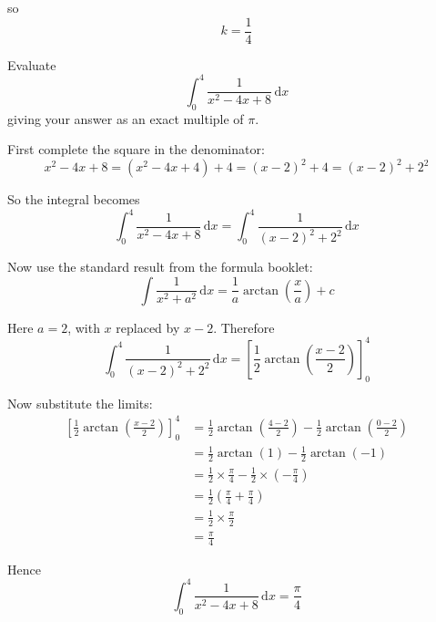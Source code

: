 \documentclass[leqno]{article}
\begin{document}
\begin{enumerate}[
  label=\textbf{\arabic*.},
  leftmargin=*,
  topsep=0pt,
  partopsep=0pt,
  parsep=0pt
]
\begin{djsSolution}
\begin{enumerate}[label=\textbf{(\alph*)}]
  so
  \[
  k=\frac{1}{4}
  \]
\end{enumerate}
\end{djsSolution}

\newpage
\questionitem

Evaluate
\[
\int_{0}^{4} \frac{1}{x^2-4x+8}\, \mathrm{d}x
\]
giving your answer as an exact multiple of $\pi$. 

\vspace*{10pt}

\begin{djsSolution}
First complete the square in the denominator:
\[
x^2-4x+8=(x^2-4x+4)+4=(x-2)^2+4=(x-2)^2+2^2
\]

So the integral becomes
\[
\int_0^4 \frac{1}{x^2-4x+8}\,\mathrm{d}x
=
\int_0^4 \frac{1}{(x-2)^2+2^2}\,\mathrm{d}x
\]

Now use the standard result from the formula booklet:
\[
\int \frac{1}{x^2+a^2}\,\mathrm{d}x=\frac{1}{a}\arctan\left(\frac{x}{a}\right)+c
\]

Here $a=2$, with $x$ replaced by $x-2$. Therefore
\[
\int_0^4 \frac{1}{(x-2)^2+2^2}\,\mathrm{d}x
=
\left[\frac{1}{2}\arctan\left(\frac{x-2}{2}\right)\right]_0^4
\]

Now substitute the limits:
\begin{align*}
\left[\frac{1}{2}\arctan\left(\frac{x-2}{2}\right)\right]_0^4
&=
\frac{1}{2}\arctan\left(\frac{4-2}{2}\right)
-
\frac{1}{2}\arctan\left(\frac{0-2}{2}\right) \\
&=
\frac{1}{2}\arctan(1)-\frac{1}{2}\arctan(-1) \\
&=
\frac{1}{2}\times\frac{\pi}{4}-\frac{1}{2}\times\left(-\frac{\pi}{4}\right) \\
&=
\frac{1}{2}\left(\frac{\pi}{4}+\frac{\pi}{4}\right) \\
&=
\frac{1}{2}\times\frac{\pi}{2} \\
&=
\frac{\pi}{4}
\end{align*}

Hence
\[
\int_{0}^{4} \frac{1}{x^2-4x+8}\,\mathrm{d}x=\frac{\pi}{4}
\]
\end{djsSolution}


\newpage

\questionitem


\end{enumerate}
\end{document}
